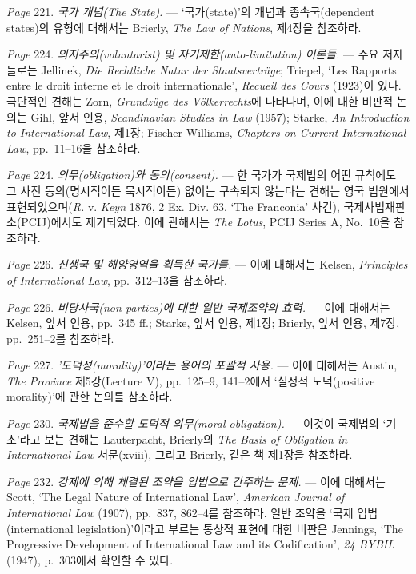 {\emph{Page} 221. \emph{국가 개념(The State).} --- `국가(state)'의 개념과
종속국(dependent states)의 유형에 대해서는 Brierly, \emph{The Law of
Nations}, 제4장을 참조하라.

\emph{Page} 224. \emph{의지주의(voluntarist) 및
자기제한(auto-limitation) 이론들.} --- 주요 저자들로는 Jellinek,
\emph{Die Rechtliche Natur der Staatsverträge}; Triepel, `Les Rapports
entre le droit interne et le droit internationale', \emph{Recueil des
Cours} (1923)이 있다. 극단적인 견해는 Zorn, \emph{Grundzüge des
Völkerrechts}에 나타나며, 이에 대한 비판적 논의는 Gihl, 앞서 인용,
\emph{Scandinavian Studies in Law} (1957); Starke, \emph{An Introduction
to International Law}, 제1장; Fischer Williams, \emph{Chapters on
Current International Law}, pp.~11--16을 참조하라.

\emph{Page} 224. \emph{의무(obligation)와 동의(consent).} --- 한 국가가
국제법의 어떤 규칙에도 그 사전 동의(명시적이든 묵시적이든) 없이는
구속되지 않는다는 견해는 영국 법원에서 표현되었으며(\emph{R.} v.
\emph{Keyn} 1876, 2 Ex. Div. 63, `The Franconia' 사건),
국제사법재판소(PCIJ)에서도 제기되었다. 이에 관해서는 \emph{The Lotus},
PCIJ Series A, No.~10을 참조하라.

\emph{Page} 226. \emph{신생국 및 해양영역을 획득한 국가들.} --- 이에
대해서는 Kelsen, \emph{Principles of International Law}, pp.~312--13을
참조하라.

\emph{Page} 226. \emph{비당사국(non-parties)에 대한 일반 국제조약의
효력.} --- 이에 대해서는 Kelsen, 앞서 인용, pp.~345 ff.; Starke, 앞서
인용, 제1장; Brierly, 앞서 인용, 제7장, pp.~251--2를 참조하라.

\emph{Page} 227. \emph{'도덕성(morality)'이라는 용어의 포괄적 사용.} ---
이에 대해서는 Austin, \emph{The Province} 제5강(Lecture V), pp.~125--9,
141--2에서 `실정적 도덕(positive morality)'에 관한 논의를 참조하라.

\emph{Page} 230. \emph{국제법을 준수할 도덕적 의무(moral obligation).}
--- 이것이 국제법의 `기초'라고 보는 견해는 Lauterpacht, Brierly의
\emph{The Basis of Obligation in International Law} 서문(xviii), 그리고
Brierly, 같은 책 제1장을 참조하라.

\emph{Page} 232. \emph{강제에 의해 체결된 조약을 입법으로 간주하는
문제.} --- 이에 대해서는 Scott, `The Legal Nature of International Law',
\emph{American Journal of International Law} (1907), pp.~837, 862--4를
참조하라. 일반 조약을 `국제 입법(international legislation)'이라고
부르는 통상적 표현에 대한 비판은 Jennings, `The Progressive Development
of International Law and its Codification', \emph{24 BYBIL} (1947),
p.~303에서 확인할 수 있다.

}
